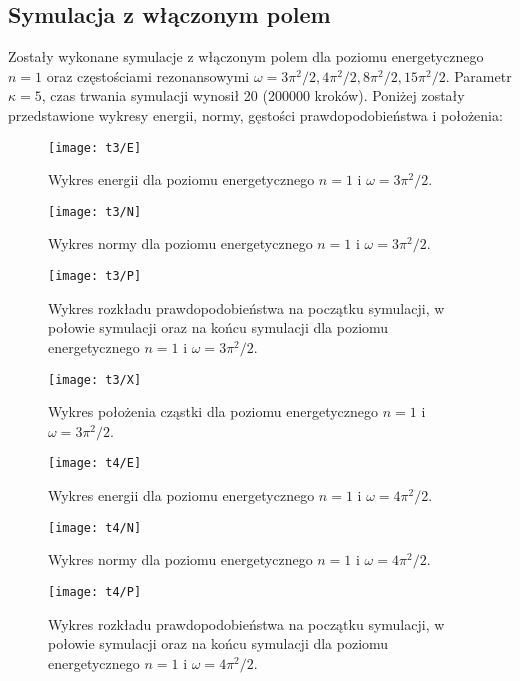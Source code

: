 \documentclass[a4paper,10pt]{article}
\begin{document}
	\subsection{Symulacja z włączonym polem}
	Zostały wykonane symulacje z włączonym polem dla poziomu energetycznego $n=1$ oraz częstościami rezonansowymi $\omega = 3\pi^2/2, 4\pi^2/2, 8\pi^2/2, 15\pi^2/2$. Parametr $\kappa = 5$, czas trwania symulacji wynosił 20 (200000 kroków). Poniżej zostały przedstawione wykresy energii, normy, gęstości prawdopodobieństwa i położenia:
	\begin{figure}[h]
	    \centering
	    \texttt{[image: t3/E]}
	    \caption{Wykres energii dla poziomu energetycznego $n = 1$ i $\omega = 3\pi^2/2$.}
		\label{t3e}
	\end{figure}		

	\begin{figure}[h]
	    \centering
	    \texttt{[image: t3/N]}
	    \caption{Wykres normy dla poziomu energetycznego $n = 1$ i $\omega = 3\pi^2/2$.}
		\label{t3n}
	\end{figure}

	\begin{figure}[h]
	    \centering
	    \texttt{[image: t3/P]}
	    \caption{Wykres rozkładu prawdopodobieństwa na początku symulacji, w połowie symulacji oraz na końcu symulacji dla poziomu energetycznego $n = 1$ i $\omega = 3\pi^2/2$.}
		\label{t3p}
	\end{figure}

	\begin{figure}[h]
	    \centering
	    \texttt{[image: t3/X]}
	    \caption{Wykres położenia cząstki dla poziomu energetycznego $n = 1$ i $\omega = 3\pi^2/2$.}
		\label{t3x}
	\end{figure}

	\begin{figure}[h]
	    \centering
	    \texttt{[image: t4/E]}
	    \caption{Wykres energii dla poziomu energetycznego $n = 1$ i $\omega = 4\pi^2/2$.}
		\label{t4e}
	\end{figure}		

	\begin{figure}[h]
	    \centering
	    \texttt{[image: t4/N]}
	    \caption{Wykres normy dla poziomu energetycznego $n = 1$ i $\omega = 4\pi^2/2$.}
		\label{t4n}
	\end{figure}

	\begin{figure}[h]
	    \centering
	    \texttt{[image: t4/P]}
	    \caption{Wykres rozkładu prawdopodobieństwa na początku symulacji, w połowie symulacji oraz na końcu symulacji dla poziomu energetycznego $n = 1$ i $\omega = 4\pi^2/2$.}
		\label{t4p}
	\end{figure}
\end{document}
